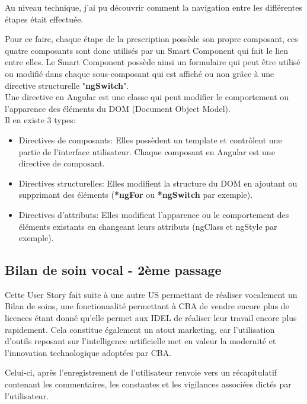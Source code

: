 \documentclass{article}
\begin{document}
Au niveau technique, j'ai pu découvrir comment la navigation entre les différentes étapes était effectuée.

Pour ce faire, chaque étape de la prescription possède son propre composant, ces quatre composants sont donc utilisés par un Smart Component qui fait le lien entre elles. Le Smart Component possède ainsi un formulaire qui peut être utilisé ou modifié dans chaque sous-composant qui est affiché ou non grâce à une directive structurelle "\textbf{ngSwitch}". \\

Une directive en Angular est une classe qui peut modifier le comportement ou l'apparence des éléments du DOM (Document Object Model). \\ 

Il en existe 3 types:

\begin{itemize}
    \item Directives de composants: Elles possèdent un template et contrôlent une partie de l'interface utilisateur. Chaque composant en Angular est une directive de composant.
    \item Directives structurelles: Elles modifient la structure du DOM en ajoutant ou supprimant des éléments (\textbf{*ngFor} ou \textbf{*ngSwitch} par exemple).
    \item Directives d'attributs: Elles modifient l'apparence ou le comportement des éléments existants en changeant leurs attributs (ngClass et ngStyle par exemple).
\end{itemize}

\subsection{Bilan de soin vocal - 2ème passage}

Cette User Story fait suite à une autre US permettant de réaliser vocalement un Bilan de soins, une fonctionnalité permettant à CBA de vendre encore plus de licences étant donné qu'elle permet aux IDEL de réaliser leur travail encore plus rapidement. Cela constitue également un atout marketing, car l'utilisation d'outils reposant sur l'intelligence artificielle met en valeur la modernité et l'innovation technologique adoptées par CBA.

Celui-ci, après l'enregistrement de l'utilisateur renvoie vers un récapitulatif contenant les commentaires, les constantes et les vigilances associées dictés par l'utilisateur.
\end{document}

